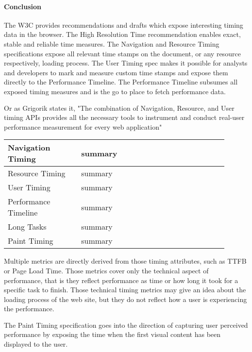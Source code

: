 \paragraph{Conclusion}


The W3C provides recommendations and drafts which expose interesting timing data in the browser. %
The High Resolution Time recommendation enables exact, stable and reliable time measures.
The Navigation and Resource Timing specifications expose all relevant time stamps on the document, or any resource respectively, loading process.
The User Timing spec makes it possible for analysts and developers to mark and measure custom time stamps and expose them directly to the Performance Timeline.
The Performance Timeline subsumes all exposed timing measures and is the go to place to fetch performance data.

Or as Grigorik states it, "The combination of Navigation, Resource, and User timing APIs provides all the necessary tools to instrument and conduct real-user performance measurement for every web application" %





\begin{center}
\small
	\begin{tabular}{ p{0.3\linewidth} | p{0.6\linewidth} }
	\hline
	Navigation Timing & summary  \\ 
	\hline
	Resource Timing & summary  \\  
	\hline
	User Timing & summary  \\  
	\hline
	Performance Timeline & summary  \\  
	\hline
	Long Tasks & summary  \\  
	\hline
	Paint Timing & summary  \\  
	\hline
	\end{tabular}
\end{center}




Multiple metrics are directly derived from those timing attributes, such as TTFB or Page Load Time.
Those metrics cover only the technical aspect of performance, that is they reflect performance as time or how long it took for a specific task to finish.
Those technical timing metrics may give an idea about the loading process of the web site, but they do not reflect how a user is experiencing the performance.

The Paint Timing specification goes into the direction of capturing user perceived performance by exposing the time when the first visual content has been displayed to the user.


